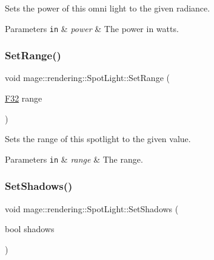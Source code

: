 Sets the power of this omni light to the given radiance.


\begin{DoxyParams}[1]{Parameters}
\mbox{\tt in}  & {\em power} & The power in watts. \\
\hline
\end{DoxyParams}
\hypertarget{classmage_1_1rendering_1_1_spot_light_a87711b67a7a16809711f9841e4708720}{}\label{classmage_1_1rendering_1_1_spot_light_a87711b67a7a16809711f9841e4708720} 
\subsubsection{\texorpdfstring{Set\+Range()}{SetRange()}}
{\footnotesize\ttfamily void mage\+::rendering\+::\+Spot\+Light\+::\+Set\+Range (\begin{DoxyParamCaption}\item[{\hyperlink{namespacemage_aa97e833b45f06d60a0a9c4fc22ae02c0}{F32}}]{range }\end{DoxyParamCaption})\hspace{0.3cm}{\ttfamily [noexcept]}}

Sets the range of this spotlight to the given value.


\begin{DoxyParams}[1]{Parameters}
\mbox{\tt in}  & {\em range} & The range. \\
\hline
\end{DoxyParams}
\hypertarget{classmage_1_1rendering_1_1_spot_light_af1f1d3aee8bdcda50d16f4b0551e4728}{}\label{classmage_1_1rendering_1_1_spot_light_af1f1d3aee8bdcda50d16f4b0551e4728} 
\subsubsection{\texorpdfstring{Set\+Shadows()}{SetShadows()}}
{\footnotesize\ttfamily void mage\+::rendering\+::\+Spot\+Light\+::\+Set\+Shadows (\begin{DoxyParamCaption}\item[{bool}]{shadows }\end{DoxyParamCaption})\hspace{0.3cm}{\ttfamily [noexcept]}}

